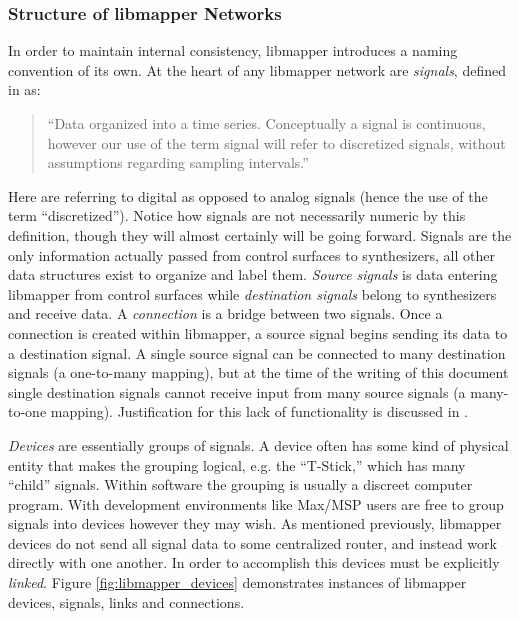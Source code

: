 	\subsubsection{Structure of libmapper Networks}

In order to maintain internal consistency, libmapper introduces a naming convention of its own. At the heart of any libmapper network are \emph{signals}, defined in  as:
\begin{quote}
``Data organized into a time series. Conceptually a signal is continuous, however our use of the term signal will refer to discretized signals, without assumptions regarding sampling intervals.''
\end{quote}
Here  are referring to digital as opposed to analog signals (hence the use of the term ``discretized''). Notice how signals are not necessarily numeric by this definition, though they will almost certainly will be going forward. Signals are the only information actually passed from control surfaces to synthesizers, all other data structures exist to organize and label them. \emph{Source signals} is data entering libmapper from control surfaces while \emph{destination signals} belong to synthesizers and receive data. A \emph{connection} is a bridge between two signals. Once a connection is created within libmapper, a source signal begins sending its data to a destination signal. A single source signal can be connected to many destination signals (a one-to-many mapping), but at the time of the writing of this document single destination signals cannot receive input from many source signals (a many-to-one mapping). Justification for this lack of functionality is discussed in .

\emph{Devices} are essentially groups of signals. A device often has some kind of physical entity that makes the grouping logical, e.g. the ``T-Stick,'' which has many ``child'' signals. Within software the grouping is usually a discreet computer program. With development environments like Max/MSP users are free to group signals into devices however they may wish. As mentioned previously, libmapper devices do not send all signal data to some centralized router, and instead work directly with one another. In order to accomplish this devices must be explicitly \emph{linked}. Figure \ref{fig:libmapper_devices} demonstrates instances of libmapper devices, signals, links and connections.

